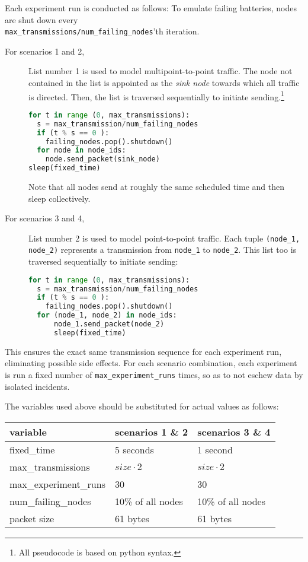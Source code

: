 \documentclass{acm_proc_article-sp}
\begin{document}
Each experiment run is conducted as follows:
To emulate failing batteries, nodes are shut down every\\
\texttt{max\_transmissions/num\_failing\_nodes}'th iteration.
\begin{description}
\item[For scenarios 1 and 2,] List number 1 is used to model multipoint-to-point traffic. The node not contained in the list is appointed as the \emph{sink node} towards which all traffic is directed. Then, the list is traversed sequentially to initiate sending.\footnote{All pseudocode is based on python syntax.} %
\begin{lstlisting}[language=python]
for t in range (0, max_transmissions):
  s = max_transmission/num_failing_nodes
  if (t % s == 0 ):
    failing_nodes.pop().shutdown()
  for node in node_ids:
    node.send_packet(sink_node)
sleep(fixed_time)
\end{lstlisting}
Note that all nodes send at roughly the same scheduled time and then sleep collectively.
\item[For scenarios 3 and 4,] List number 2 is used to model point-to-point traffic. Each tuple \texttt{(node\_1, node\_2)} represents a transmission from \texttt{node\_1} to \texttt{node\_2}. This list too is traversed sequentially to initiate sending:
\begin{lstlisting}[language=python]
for t in range (0, max_transmissions):
  s = max_transmission/num_failing_nodes
  if (t % s == 0 ):
    failing_nodes.pop().shutdown()
  for (node_1, node_2) in node_ids:
      node_1.send_packet(node_2)
      sleep(fixed_time)
\end{lstlisting}
\end{description}
This ensures the exact same transmission sequence for each experiment run, eliminating possible side effects.
For each scenario combination, each experiment is run a fixed number of \texttt{max\_experiment\_runs} times, so as to not eschew data by isolated incidents.

The variables used above should be substituted for actual values as follows:

\begin{tabularx}{\linewidth}{l | l | l}
  variable & scenarios 1 \& 2 & scenarios 3 \& 4  \\
  \hline
  fixed\_time & 5 seconds & 1 second \\ %
  max\_transmissions & $size \cdot 2$ & $size \cdot 2$ \\
  max\_experiment\_runs & 30 & 30 \\
  num\_failing\_nodes & 10\% of all nodes & 10\% of all nodes \\
  packet size & 61 bytes & 61 bytes
\end{tabularx}
\end{document}
